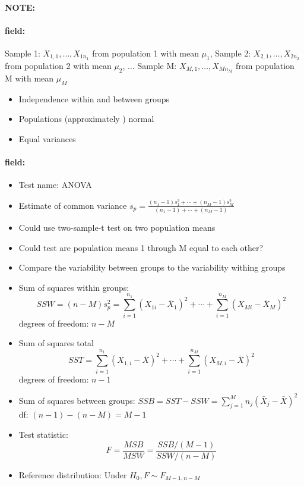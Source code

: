 \documentclass[12pt]{article}
\newenvironment{note}{\paragraph{NOTE:}}{}
\newenvironment{field}{\paragraph{field:}}{}
\begin{document}
\begin{note}
  \begin{field}
    Sample 1: $X_{1,1}, \ldots , X_{1n_1}$ from population 1 with mean $\mu_1$, Sample 2: $X_{2,1}, \ldots , X_{2n_2}$ from population 2 with mean $\mu_2$, $\ldots $ Sample M: $X_{M,1}, \ldots , X_{Mn_M}$ from population M with mean $\mu_M$
    \begin{itemize}
      \item Independence within and between groups
      \item Populations (approximately ) normal
      \item Equal variances
    \end{itemize}
  \end{field}
  \begin{field}
    \begin{itemize}
      \item Test name: ANOVA
      \item Estimate of common variance $s_p = \frac{(n_1-1)s_1^2 + \cdots + (n_M -1)s_M^2}{(n_1-1) + \cdots + (n_M-1)}$
      \item Could use two-sample-t test on two population means
      \item Could test are population means 1 through M equal to each other?
      \item Compare the variability between groups to the variability withing groups
      \item Sum of squares within groups:
      $$ SSW = (n-M)s_p^2  = \sum_{i=1}^{n_1}(X_{1i} - \bar{X}_1)^2 + \cdots +  \sum_{i=1}^{n_M}(X_{Mi} - \bar{X}_M)^2$$
      degrees of freedom: $n-M$
      \item Sum of squares total
       $$ SST  = \sum_{i=1}^{n_1}(X_{1,i} - \bar{X})^2 + \cdots + \sum_{i=1}^{n_M} (X_{M,i} - \bar{X})^2$$
       degrees of freedom: $n-1$
       \item Sum of squares between groups: $ SSB = SST - SSW = \sum_{j=1}^Mn_j(\bar{X}_j - \bar{X})^2$ df: $(n-1) - (n-M) = M-1$
       \item Test statistic: $$ F = \frac{MSB}{MSW} = \frac{SSB/(M-1)}{SSW/(n-M)} $$
       \item Reference distribution: Under $H_0, F \sim F_{M-1, n-M}$
    \end{itemize}
  \end{field}
\end{note}

\end{document}
